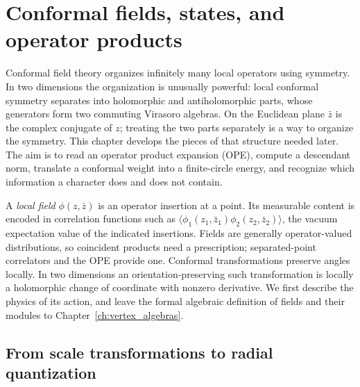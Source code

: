 \chapter{Conformal fields, states, and operator products}
\label{ch:cft}

Conformal field theory organizes infinitely many local operators using
symmetry. In two dimensions the organization is unusually powerful:
local conformal symmetry separates into holomorphic and antiholomorphic
parts, whose generators form two commuting Virasoro algebras. On the
Euclidean plane $\bar z$ is the complex conjugate of $z$; treating the
two parts separately is a way to organize the symmetry. This chapter
develops the pieces of that structure needed
later. The aim is to read an operator product expansion (OPE), compute
a descendant norm,
translate a conformal weight into a finite-circle energy, and recognize
which information a character does and does not contain.

A \emph{local field} $\phi(z,\bar z)$ is an operator insertion at a
point. Its measurable content is encoded in correlation functions such
as $\langle\phi_1(z_1,\bar z_1)\phi_2(z_2,\bar z_2)\rangle$, the
vacuum expectation value of the indicated insertions. Fields are
generally operator-valued distributions, so coincident products need a
prescription; separated-point correlators and the OPE provide one.
Conformal transformations preserve angles locally. In two dimensions
an orientation-preserving such transformation is locally a holomorphic
change of coordinate with nonzero derivative. We first describe the
physics of its action, and leave the formal algebraic definition of
fields and their modules to Chapter~\ref{ch:vertex_algebras}.

\section{From scale transformations to radial quantization}


